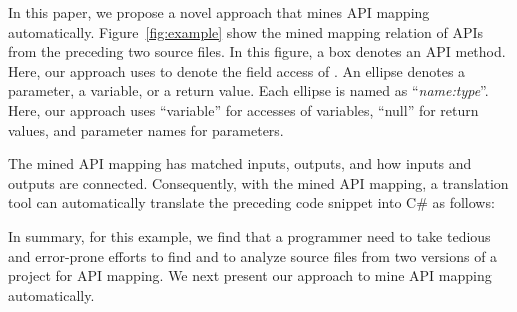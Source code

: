In this paper, we propose a novel approach that mines API mapping
automatically. Figure~\ref{fig:example} show the mined mapping
relation of APIs from the preceding two source files. In this
figure, a box denotes an API method. Here, our approach uses
 to denote the field access of
. An ellipse denotes a parameter, a variable, or a
return value. Each ellipse is named as ``\emph{name:type}''. Here,
our approach uses ``variable'' for accesses of variables, ``null''
for return values, and parameter names for parameters.


The mined API mapping has matched inputs, outputs, and how inputs
and outputs are connected. Consequently, with the mined API mapping,
a translation tool can automatically translate the preceding code
snippet into C\# as follows:



In summary, for this example, we find that a programmer need to take
tedious and error-prone efforts to find and to analyze source files
from two versions of a project for API mapping. We next present our
approach to mine API mapping automatically.


